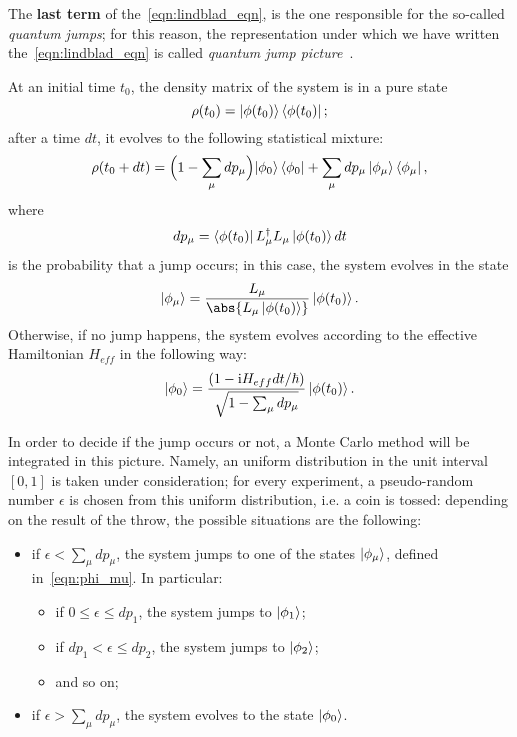 The \textbf{last term} of the~\ref{eqn:lindblad_eqn}, is the one responsible for the so-called \emph{quantum jumps}; for this reason, the representation under which we have written the~\ref{eqn:lindblad_eqn} is called \emph{quantum jump picture}~\cite{PhysRevA.69.062317}. 

At an initial time $t_0$, the density matrix of the system is in a pure state
\[
\rho(t_0) = \ket{\phi(t_0)}\bra{\phi(t_0)};
\]
after a time $dt$, it evolves to the following statistical mixture:
\begin{equation}
    \rho(t_0 + dt) = \Bigl(1-\sum_\mu dp_\mu \Bigl)\ket{\phi_0}\bra{\phi_0} + \sum_\mu dp_\mu \ket{\phi_\mu}\bra{\phi_\mu},
\end{equation}
where
\begin{equation}
    dp_\mu = \bra{\phi(t_0)}L_{\mu}^{\dagger}L_{\mu}\ket{\phi(t_0)}dt
\end{equation}
is the probability that a jump occurs; in this case, the system evolves in the state
\begin{equation}
\label{eqn:phi_mu}
    \ket{\phi_\mu} = \frac{L_\mu}{\abs{L_\mu\ket{\phi(t_0)}}}\ket{\phi(t_0)}.
\end{equation}
Otherwise, if no jump happens, the system evolves according to the effective Hamiltonian $H_{eff}$ in the following way:
\begin{equation}
    \ket{\phi_0} = \frac{(1-\textrm{i}H_{eff}dt/\hbar)}{\sqrt{1-\sum_\mu dp_\mu}}\ket{\phi(t_0)}.
\end{equation}

In order to decide if the jump occurs or not, a Monte Carlo method will be integrated in this picture. Namely, an uniform distribution in the unit interval $[0,1]$ is taken under consideration; for every experiment, a pseudo-random number $\epsilon$ is chosen from this uniform distribution, i.e. a coin is tossed: depending on the result of the throw, the possible situations are the following:
\begin{itemize}
    \item if $\epsilon < \sum_\mu dp_\mu$, the system jumps to one of the states $\ket{\phi_\mu}$, defined in~\ref{eqn:phi_mu}. In particular:
    \begin{itemize}
        \item if $0 \leq \epsilon \leq dp_1$, the system jumps to $\ket{\phi_1}$;
        \item if $dp_1 < \epsilon \leq dp_2$, the system jumps to $\ket{\phi_2}$;
        \item and so on;
    \end{itemize}
    \item if $\epsilon > \sum_\mu dp_\mu$, the system evolves to the state $\ket{\phi_0}$.
\end{itemize}

